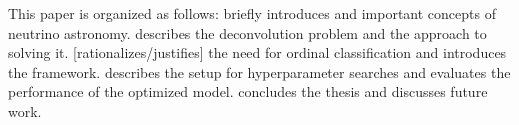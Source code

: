 This paper is organized as follows:
 briefly introduces \icecube{} and important concepts of neutrino astronomy.
 describes the deconvolution problem and the \dsea{} approach to solving it.
 [rationalizes/justifies] the need for ordinal classification and introduces the \corn{} framework.
 describes the setup for hyperparameter searches and evaluates the performance of the optimized model.
 concludes the thesis and discusses future work.
